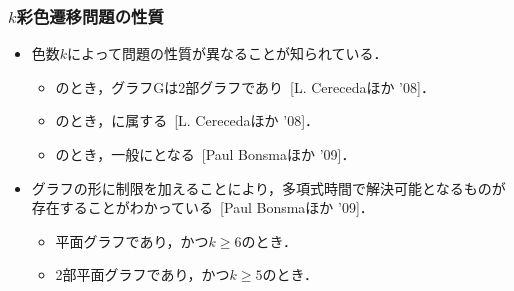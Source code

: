 \begin{frame}\frametitle{$k$彩色遷移問題の性質}

  \begin{itemize}
    \item 色数$k$によって問題の性質が異なることが知られている．
    \begin{itemize}
      \item {}のとき，グラフGは2部グラフであり~[L. Cerecedaほか '08]．
      \item {}のとき，に属する~[L. Cerecedaほか '08]．
      \item {}のとき，一般にとなる~[Paul Bonsmaほか '09]．
    \end{itemize}

    \item グラフの形に制限を加えることにより，多項式時間で解決可能となるものが存在することがわかっている~[Paul Bonsmaほか '09]．
    \begin{itemize}
      \item 平面グラフであり，かつ$k \ge 6$のとき．
      \item 2部平面グラフであり，かつ$k \ge 5$のとき．
    \end{itemize}

  \end{itemize}

\end{frame}

\begin{comment}

\begin{frame}{クラスPSPACE}
  \begin{itemize}
    \item 計算量のクラスの一つ.
    \item 決定性チューリングマシンに多項式量のメモリを与えることで解決できる問題が属する.
    \item 指数時間で解くことが可能．
    \item P$\subseteq$NP$\subseteq$PSPACEであることはわかっている.
    \begin{itemize}
      \item ただし, 真に包含するかは未解決.
    \end{itemize}
  \end{itemize}
\end{frame}
\end{comment}

